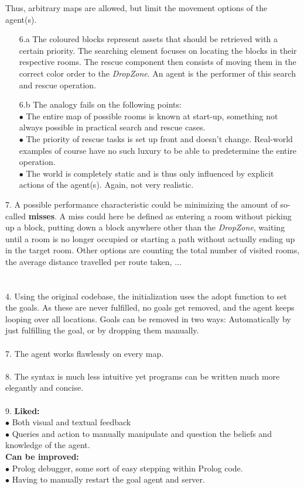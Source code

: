 \documentclass[10pt,a4paper]{article}
\begin{document}
Thus, arbitrary maps are allowed, but limit the movement options of the agent(s).
\begin{enumerate}
\item[6.a] The coloured blocks represent assets that should be retrieved with a certain priority.
The searching element focuses on locating the blocks in their respective rooms. 
The rescue component then consists of moving them in the correct color order to the \emph{DropZone}.
An agent is the performer of this search and rescue operation.
\item[6.b] The analogy fails on the following points:\\
$\bullet$ The entire map of possible rooms is known at start-up, something not always possible in practical search and rescue cases.\\
$\bullet$ The priority of rescue tasks is set up front and doesn't change. Real-world examples of course have no such luxury to be able to predetermine the entire operation.\\
$\bullet$ The world is completely static and is thus only influenced by explicit actions of the agent(s). Again, not very realistic.
\end{enumerate}
7. A possible performance characteristic could be minimizing the amount of so-called \textbf{misses}.
A miss could here be defined as entering a room without picking up a block, putting down a block anywhere other than the \emph{DropZone}, waiting until a room is no longer occupied or starting a path without actually ending up in the target room.
Other options are counting the total number of visited rooms, the average distance travelled per route taken, ...
\part{}
4. Using the original codebase, the initialization uses the adopt function to set the goals. 
As these are never fulfilled, no goals get removed, and the agent keeps looping over all locations.
Goals can be removed in two ways: Automatically by just fulfilling the goal, or by dropping them manually.\\
\\
7. The agent works flawlessly on every map.\\
\\
8. The syntax is much less intuitive yet programs can be written much more elegantly and concise.\\
\\
9. \textbf{Liked:}\\
$\bullet$ Both visual and textual feedback\\
$\bullet$ Queries and action to manually manipulate and question the beliefs and knowledge of the agent.\\
\textbf{Can be improved:}\\
$\bullet$ Prolog debugger, some sort of easy stepping within Prolog code.\\
$\bullet$ Having to manually restart the goal agent and server. 
\end{document}
